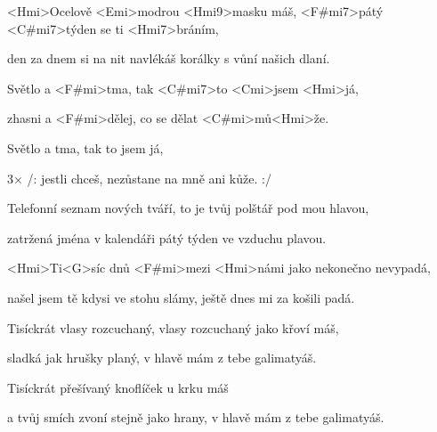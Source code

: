 

\zs
<Hmi>Ocelově <Emi>modrou <Hmi9>masku máš,
<F#mi7>pátý <C#mi7>týden se ti <Hmi7>bráním,

den za dnem si na nit navlékáš korálky s vůní našich dlaní.
\ks

\zr
Světlo a <F#mi>tma, tak <C#mi7>to <Cmi>jsem <Hmi>já,

zhasni a <F#mi>dělej, co se dělat <C#mi>mů<Hmi>že.

Světlo a tma, tak to jsem já,

3× /: jestli chceš, nezůstane na mně ani kůže. :/
\kr

\zs
Telefonní seznam nových tváří,
to je tvůj polštář pod mou hlavou,

zatržená jména v kalendáři
pátý týden ve vzduchu plavou.
\ks

\zr \kr

\zs
<Hmi>Ti<G>síc dnů <F#mi>mezi <Hmi>námi
jako nekonečno nevypadá,

našel jsem tě kdysi ve stohu slámy,
ještě dnes mi za košili padá.
\ks

\zs
Tisíckrát vlasy rozcuchaný,
vlasy rozcuchaný jako křoví máš,

sladká jak hrušky planý,
v hlavě mám z tebe galimatyáš.
\ks

\zs
Tisíckrát přešívaný
knoflíček u krku máš

a tvůj smích zvoní stejně jako hrany,
v hlavě mám z tebe galimatyáš.
\ks

\kp
